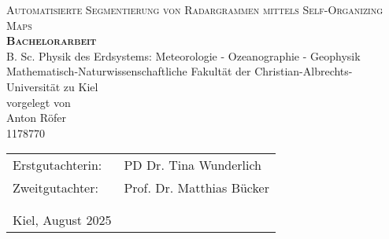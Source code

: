 \begin{titlepage}
	\begin{center}
		\huge \textsc{Automatisierte Segmentierung von Radargrammen mittels Self-Organizing Maps} \\
		\vspace{2cm}
		\LARGE\textbf{\textsc{Bachelorarbeit}}\\
		\vspace{2cm}
		{\large B. Sc. Physik des Erdsystems: Meteorologie - Ozeanographie - Geophysik \\
		Mathematisch-Naturwissenschaftliche Fakultät der Christian-Albrechts-Universität zu Kiel \\
		\vspace{2.5cm}
		vorgelegt von \\
		Anton Röfer \\
		1178770 \\}
		\vspace{4cm}
	\end{center}
	\normalsize{
		\begin{tabular}{ll}
			Erstgutachterin: & {PD Dr. Tina Wunderlich} \\
			Zweitgutachter: & {Prof. Dr. Matthias Bücker} \\
			& \\
			& \\
			Kiel, August 2025 & \\
		\end{tabular}\\
	}
\end{titlepage}